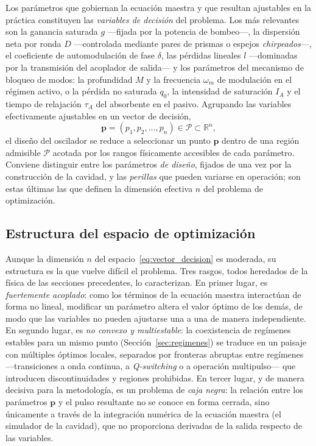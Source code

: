 Los parámetros que gobiernan la ecuación maestra y que resultan ajustables en la
práctica constituyen las \emph{variables de decisión} del problema. Los más
relevantes son la ganancia saturada $g$ —fijada por la potencia de bombeo—, la
dispersión neta por ronda $D$ —controlada mediante pares de prismas o espejos
\emph{chirpeados}—, el coeficiente de automodulación de fase $\delta$, las pérdidas
lineales $l$ —dominadas por la transmisión del acoplador de salida— y los
parámetros del mecanismo de bloqueo de modos: la profundidad $M$ y la frecuencia
$\omega_m$ de modulación en el régimen activo, o la pérdida no saturada $q_0$, la
intensidad de saturación $I_A$ y el tiempo de relajación $\tau_A$ del absorbente en
el pasivo. Agrupando las variables efectivamente ajustables en un vector de
decisión,
%
\begin{equation}
    \mathbf{p} = (p_1, p_2, \dots, p_n)
    \in \mathcal{P} \subset \mathbb{R}^{n},
    \label{eq:vector_decision}
\end{equation}
%
el diseño del oscilador se reduce a seleccionar un punto $\mathbf{p}$ dentro de una
región admisible $\mathcal{P}$ acotada por los rangos físicamente accesibles de
cada parámetro. Conviene distinguir entre los parámetros \emph{de diseño}, fijados
de una vez por la construcción de la cavidad, y las \emph{perillas} que pueden
variarse en operación; son estas últimas las que definen la dimensión efectiva $n$
del problema de optimización.

\subsection{Estructura del espacio de optimización}
\label{sec:estructura_espacio}

Aunque la dimensión $n$ del espacio~\eqref{eq:vector_decision} es moderada, su
estructura es la que vuelve difícil el problema. Tres rasgos, todos heredados de la
física de las secciones precedentes, lo caracterizan. En primer lugar, es
\emph{fuertemente acoplado}: como los términos de la ecuación maestra interactúan
de forma no lineal, modificar un parámetro altera el valor óptimo de los demás, de
modo que las variables no pueden ajustarse una a una de manera independiente. En
segundo lugar, es \emph{no convexo y multiestable}: la coexistencia de regímenes
estables para un mismo punto (Sección~\ref{sec:regimenes}) se traduce en un paisaje
con múltiples óptimos locales, separados por fronteras abruptas entre regímenes
—transiciones a onda continua, a \emph{Q-switching} o a operación multipulso— que
introducen discontinuidades y regiones prohibidas. En tercer lugar, y de manera
decisiva para la metodología, es un problema de \emph{caja negra}: la relación
entre los parámetros $\mathbf{p}$ y el pulso resultante no se conoce en forma
cerrada, sino únicamente a través de la integración numérica de la ecuación maestra
(el simulador de la cavidad), que no proporciona derivadas de la salida respecto de
las variables.

